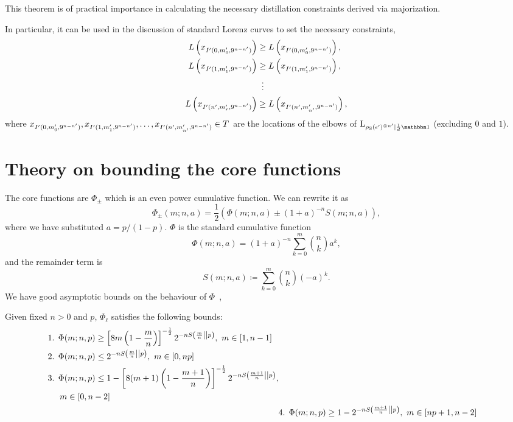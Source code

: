 This theorem is of practical importance in calculating the necessary distillation constraints derived via majorization.

In particular, it can be used in the discussion of standard Lorenz curves to set the necessary constraints,
\begin{align}
L\left(x_{\II'(0, \mlt'_{0}, 9^{\nn-\tt})}\right) &\geq L\left(x_{\II'(0, m'_{0}, 9^{\nn-\tt})}\right), \nonumber\\
L\left(x_{\II'(1, \mlt'_{1}, 9^{\nn-\tt})}\right) &\geq L\left(x_{\II'(1, m'_{1}, 9^{\nn-\tt})}\right), \nonumber\\
&\vdotswithin{=} \nonumber\\
L\left(x_{\II'(\tt, \mlt'_{r}, 9^{\nn-\tt})}\right) &\geq L\left(x_{\II'(\tt, m'_{\tt}, 9^{\nn-\tt})}\right), \nonumber
\end{align}
where $x_{I'(0, m'_{0}, 9^{n - n'})}, x_{I'(1, m'_{1}, 9^{n - n'})}, \dots, x_{I'(n', m'_{n'}, 9^{n - n'})} \in T$ are the locations of the elbows of $\lc{\rho_{\rm{S}}(\epsilon')\too{\tt}}{\frac{1}{d}\id}$ (excluding $0$ and $1$).

\section{Theory on bounding the core functions}
The core functions are $\Phi_{\pm}$ which is an even power cumulative function. 
We can rewrite it as
\begin{equation}
\Phi_{\pm}(m; n, a) = \frac{1}{2}( \Phi(m; n, a) \pm (1+a)^{-n} S(m; n, a) ),
\end{equation}
where we have substituted $a = p/(1-p)$. 
$\Phi$ is the standard cumulative function 
\begin{equation}
	\Phi(m; n, a) = (1+a)^{-n} \sum_{k=0}^m \binom{n}{k} a^k,
\end{equation}
and the remainder term is
\begin{equation}
S(m; n, a) \coloneqq \sum_{k=0}^m \binom{n}{k} (-a)^k.
\end{equation}
We have good asymptotic bounds on the behaviour of $\Phi$~\cite{cit:ash},
\begin{lemma}\label{lem:phil_bounds}
	Given fixed $n>0$ and $p$, $\Phi_\ell$ satisfies the following bounds:
	\begin{align*}
		\begin{split}
		&\text{1. } \Phi(m; n, p) \geq \left[ 8m\left(1-\frac{m}{n}\right) \right]^{-\frac{1}{2}} 2^{-n{S\left( \frac{m}{n} \middle\vert\middle\vert p \right)}},\ m\in [1,n-1] \\
		&\text{2. } \Phi(m; n, p) \leq 2^{-n{S\left( \frac{m}{n} \middle\vert\middle\vert p \right)}},\ m\in [0,np] \\
		&\text{3. } \Phi(m; n, p) \leq 1 - \left[ 8(m+1)\left(1-\frac{m+1}{n}\right) \right]^{-\frac{1}{2}} 2^{-nS\left( \frac{m+1}{n} \middle\vert\middle\vert p \right)}, \\
		&\hspace{14pt} m\in [0,n-2]
		\end{split}
		\\
		&\text{4. } \Phi(m; n, p) \geq 1 - 2^{-nS\left( \frac{m+1}{n} \middle\vert\middle\vert p \right)},\ m\in [np+1,n-2]
	\end{align*}
\end{lemma}

